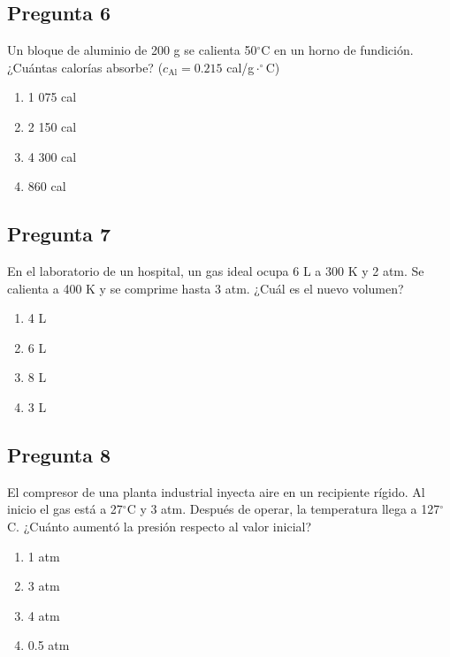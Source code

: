 
\begin{preguntabox}
\subsection{Pregunta 6}
Un bloque de aluminio de 200 g se calienta 50$^\circ$C en un horno de fundición. ¿Cuántas calorías absorbe? ($c_{\text{Al}} = 0.215$ cal/g$\cdot^\circ$C)

\begin{enumerate}
    \item[A)] 1 075 cal
    \item[B)] 2 150 cal
    \item[C)] 4 300 cal
    \item[D)] 860 cal
\end{enumerate}
\end{preguntabox}

\begin{preguntabox}
\subsection{Pregunta 7}
En el laboratorio de un hospital, un gas ideal ocupa 6 L a 300 K y 2 atm. Se calienta a 400 K y se comprime hasta 3 atm. ¿Cuál es el nuevo volumen?

\begin{enumerate}
    \item[A)] 4 L
    \item[B)] 6 L
    \item[C)] 8 L
    \item[D)] 3 L
\end{enumerate}
\end{preguntabox}

\begin{preguntabox}
\subsection{Pregunta 8}
El compresor de una planta industrial inyecta aire en un recipiente rígido. Al inicio el gas está a 27$^\circ$C y 3 atm. Después de operar, la temperatura llega a 127$^\circ$C. ¿Cuánto aumentó la presión respecto al valor inicial?

\begin{enumerate}
    \item[A)] 1 atm
    \item[B)] 3 atm
    \item[C)] 4 atm
    \item[D)] 0.5 atm
\end{enumerate}
\end{preguntabox}

